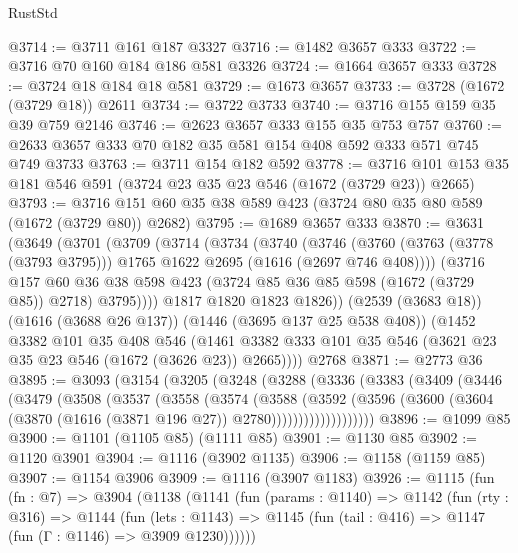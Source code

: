 \begin{lexlean}{RustStd}
\begin{coremodule}
@3714 := @3711 @161 @187 @3327
@3716 := @1482 @3657 @333
@3722 := @3716 @70 @160 @184 @186 @581 @3326
@3724 := @1664 @3657 @333
@3728 := @3724 @18 @184 @18 @581
@3729 := @1673 @3657
@3733 := @3728 (@1672 (@3729 @18)) @2611
@3734 := @3722 @3733
@3740 := @3716 @155 @159 @35 @39 @759 @2146
@3746 := @2623 @3657 @333 @155 @35 @753 @757
@3760 := @2633 @3657 @333 @70 @182 @35 @581 @154 @408 @592 @333 @571 @745 @749 @3733
@3763 := @3711 @154 @182 @592
@3778 := @3716 @101 @153 @35 @181 @546 @591 (@3724 @23 @35 @23 @546 (@1672 (@3729 @23)) @2665)
@3793 := @3716 @151 @60 @35 @38 @589 @423 (@3724 @80 @35 @80 @589 (@1672 (@3729 @80)) @2682)
@3795 := @1689 @3657 @333
@3870 := @3631
    (@3649
      (@3701
        (@3709
          (@3714
            (@3734
              (@3740
                (@3746
                  (@3760 (@3763 (@3778 (@3793 @3795))) @1765 @1622 @2695 (@1616 (@2697 @746 @408))))
                (@3716
                  @157
                  @60
                  @36
                  @38
                  @598
                  @423
                  (@3724 @85 @36 @85 @598 (@1672 (@3729 @85)) @2718)
                  @3795))))
          @1817
          @1820
          @1823
          @1826))
      (@2539 (@3683 @18))
      (@1616 (@3688 @26 @137))
      (@1446 (@3695 @137 @25 @538 @408))
      (@1452
        @3382
        @101
        @35
        @408
        @546
        (@1461 @3382 @333 @101 @35 @546 (@3621 @23 @35 @23 @546 (@1672 (@3626 @23)) @2665))))
    @2768
@3871 := @2773 @36
@3895 := @3093
    (@3154
      (@3205
        (@3248
          (@3288
            (@3336
              (@3383
                (@3409
                  (@3446
                    (@3479
                      (@3508
                        (@3537
                          (@3558
                            (@3574
                              (@3588
                                (@3592
                                  (@3596
                                    (@3600
                                      (@3604
                                        (@3870 (@1616 (@3871 @196 @27)) @2780)))))))))))))))))))
@3896 := @1099 @85
@3900 := @1101 (@1105 @85) (@1111 @85)
@3901 := @1130 @85
@3902 := @1120 @3901
@3904 := @1116 (@3902 @1135)
@3906 := @1158 (@1159 @85)
@3907 := @1154 @3906
@3909 := @1116 (@3907 @1183)
@3926 := @1115
    (fun (fn : @7) =>
    @3904
      (@1138
        (@1141
          (fun (params : @1140) =>
          @1142
            (fun (rty : @316) =>
            @1144
              (fun (lets : @1143) =>
              @1145 (fun (tail : @416) => @1147 (fun (Γ : @1146) => @3909 @1230))))))

\end{coremodule}
\end{lexlean}
